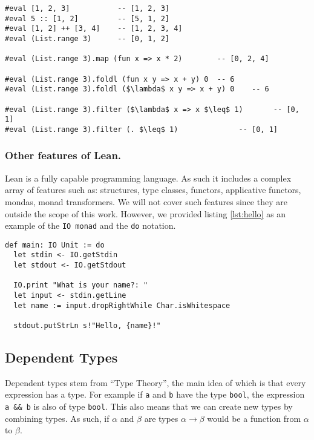 \documentclass[runningheads]{llncs}
\begin{document}
\begin{lstlisting}[caption={An example of using lists and higher-order functions in Lean. Usage of lambda abstractions and syntactic sugar can be observed.}, label=lst:fold, mathescape]
#eval [1, 2, 3]           -- [1, 2, 3]
#eval 5 :: [1, 2]         -- [5, 1, 2]
#eval [1, 2] ++ [3, 4]    -- [1, 2, 3, 4]
#eval (List.range 3)      -- [0, 1, 2]

#eval (List.range 3).map (fun x => x * 2)        -- [0, 2, 4] 

#eval (List.range 3).foldl (fun x y => x + y) 0  -- 6
#eval (List.range 3).foldl ($\lambda$ x y => x + y) 0    -- 6

#eval (List.range 3).filter ($\lambda$ x => x $\leq$ 1)       -- [0, 1]
#eval (List.range 3).filter (. $\leq$ 1)              -- [0, 1]

\end{lstlisting}

\subsubsection{Other features of Lean.}

Lean is a fully capable programming language. As such it includes a complex
array of features such as: structures, type classes, functors, applicative
functors, mondas, monad transformers. We will not cover such features since
they are outside the scope of this work. However, we provided listing
\ref{lst:hello} as an example of the \lstinline{IO monad} and the
\lstinline{do} notation.

\begin{lstlisting}[caption={Hello World example in Lean}, label=lst:hello]
def main: IO Unit := do
  let stdin <- IO.getStdin
  let stdout <- IO.getStdout

  IO.print "What is your name?: "
  let input <- stdin.getLine
  let name := input.dropRightWhile Char.isWhitespace

  stdout.putStrLn s!"Hello, {name}!"
\end{lstlisting}

\subsection{Dependent Types}
\label{sec:dt}

Dependent types stem from ``Type Theory'', the main idea of which is that every
expression has a type. For example if \lstinline{a} and \lstinline{b} have the
type \lstinline{bool}, the expression  \lstinline{a && b} is also of type
\lstinline{bool}. This also means that we can create new types by combining
types. As such, if $\alpha$ and $\beta$ are types $\alpha \rightarrow \beta$
would be a function from $\alpha$ to $\beta$.
\end{document}
